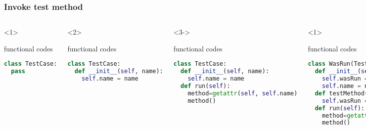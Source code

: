 \documentclass[lualatex]{beamer}
\begin{document}
\begin{frame}[fragile,t]
    \frametitle{Invoke test method}

    \begin{columns}[t]
        \small
        \begin{onlyenv}<1>
            \begin{block}{functional codes}
                \begin{lstlisting}[language=Python,columns=fullflexible]
class TestCase:
  pass
                \end{lstlisting}
            \end{block}
        \end{onlyenv}

        \begin{onlyenv}<2>
            \begin{block}{functional codes}
                \begin{lstlisting}[language=Python,columns=fullflexible]
class TestCase:
  def __init__(self, name):
    self.name = name
                \end{lstlisting}
            \end{block}
        \end{onlyenv}

        \begin{onlyenv}<3->
            \begin{block}{functional codes}
                \begin{lstlisting}[language=Python,columns=fullflexible]
class TestCase:
  def __init__(self, name):
    self.name = name
  def run(self):
    method=getattr(self, self.name)
    method()
                \end{lstlisting}
            \end{block}
        \end{onlyenv}

        \begin{onlyenv}<1>
            \begin{block}{functional codes}
                \begin{lstlisting}[language=Python,columns=fullflexible]
class WasRun(TestCase):
  def __init__(self, name):
    self.wasRun = 0
    self.name = name
  def testMethod(self):
    self.wasRun = 1
  def run(self):
    method=getattr(self, self.name)
    method()
                \end{lstlisting}
            \end{block}
        \end{onlyenv}


\end{columns}
\end{frame}
\end{document}
